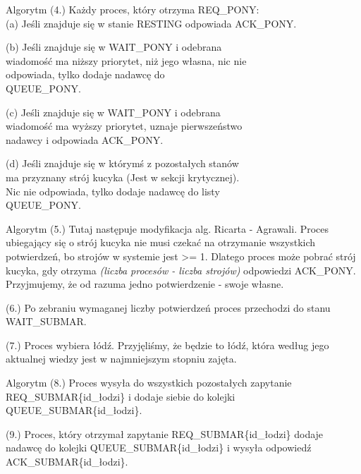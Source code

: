 \documentclass{beamer}
\newcommand\tab[1][1cm]{\hspace*{#1}}
\begin{document}
\begin{frame}{Algorytm}
    \internallinenumbers
    (4.) Każdy proces, który otrzyma REQ\_PONY: \\
        \tab[0.4cm] (a) Jeśli znajduje się w stanie RESTING odpowiada
        \tab[1cm] ACK\_PONY.

        \tab[0.4cm] (b) Jeśli znajduje się w WAIT\_PONY i odebrana\\
        \tab[1cm] wiadomość ma niższy priorytet, niż jego własna, nic nie\\
        \tab[1cm] odpowiada, tylko dodaje nadawcę do\\
        \tab[1cm] QUEUE\_PONY.
        
        \tab[0.4cm] (c) Jeśli znajduje się w WAIT\_PONY i odebrana\\
        \tab[1cm] wiadomość ma wyższy priorytet, uznaje pierwszeństwo  \\
        \tab[1cm] nadawcy i odpowiada ACK\_PONY.

        \tab[0.4cm] (d) Jeśli znajduje się w którymś z pozostałych stanów \\
        \tab[1cm] ma przyznany strój kucyka (Jest w sekcji krytycznej). \\
        \tab[1cm] Nic nie odpowiada, tylko dodaje nadawcę do listy \\
        \tab[1cm] QUEUE\_PONY.
\end{frame}

\begin{frame}{Algorytm}
    \internallinenumbers
    (5.) Tutaj następuje modyfikacja alg. Ricarta - Agrawali. Proces ubiegający się o strój kucyka nie musi czekać na otrzymanie wszystkich potwierdzeń, bo strojów w systemie jest >= 1. Dlatego proces może pobrać strój kucyka, gdy otrzyma \textit{(liczba procesów - liczba strojów)} odpowiedzi ACK\_PONY. Przyjmujemy, że od razuma jedno potwierdzenie - swoje własne.

    \vspace{0.5cm}
    (6.) Po zebraniu wymaganej liczby potwierdzeń proces przechodzi do stanu WAIT\_SUBMAR.

    \vspace{0.5cm}
    (7.) Proces wybiera łódź. Przyjęliśmy, że będzie to łódź, która według jego aktualnej wiedzy jest w najmniejszym stopniu zajęta.
\end{frame}

\begin{frame}{Algorytm}
    \internallinenumbers
    (8.) Proces wysyła do wszystkich pozostałych zapytanie REQ\_SUBMAR\{id\_łodzi\} i dodaje siebie do kolejki QUEUE\_SUBMAR\{id\_łodzi\}.

    \vspace{0.5cm}
    (9.) Proces, który otrzymał zapytanie REQ\_SUBMAR\{id\_łodzi\} dodaje nadawcę do kolejki QUEUE\_SUBMAR\{id\_łodzi\} i wysyła odpowiedź ACK\_SUBMAR\{id\_łodzi\}.

\end{frame}
\end{document}
